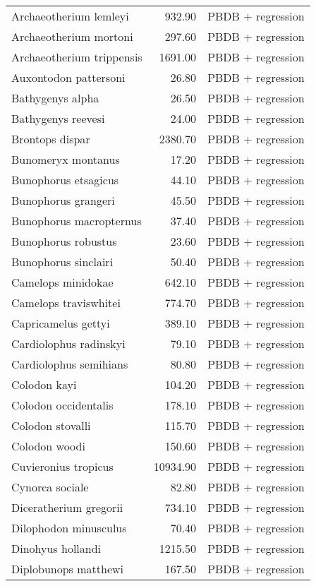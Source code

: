 \begin{table}[ht]
\begin{tabular}{lrl}
  Archaeotherium lemleyi & 932.90 & PBDB + regression \\ 
  Archaeotherium mortoni & 297.60 & PBDB + regression \\ 
  Archaeotherium trippensis & 1691.00 & PBDB + regression \\ 
  Auxontodon pattersoni & 26.80 & PBDB + regression \\ 
  Bathygenys alpha & 26.50 & PBDB + regression \\ 
  Bathygenys reevesi & 24.00 & PBDB + regression \\ 
  Brontops dispar & 2380.70 & PBDB + regression \\ 
  Bunomeryx montanus & 17.20 & PBDB + regression \\ 
  Bunophorus etsagicus & 44.10 & PBDB + regression \\ 
  Bunophorus grangeri & 45.50 & PBDB + regression \\ 
  Bunophorus macropternus & 37.40 & PBDB + regression \\ 
  Bunophorus robustus & 23.60 & PBDB + regression \\ 
  Bunophorus sinclairi & 50.40 & PBDB + regression \\ 
  Camelops minidokae & 642.10 & PBDB + regression \\ 
  Camelops traviswhitei & 774.70 & PBDB + regression \\ 
  Capricamelus gettyi & 389.10 & PBDB + regression \\ 
  Cardiolophus radinskyi & 79.10 & PBDB + regression \\ 
  Cardiolophus semihians & 80.80 & PBDB + regression \\ 
  Colodon kayi & 104.20 & PBDB + regression \\ 
  Colodon occidentalis & 178.10 & PBDB + regression \\ 
  Colodon stovalli & 115.70 & PBDB + regression \\ 
  Colodon woodi & 150.60 & PBDB + regression \\ 
  Cuvieronius tropicus & 10934.90 & PBDB + regression \\ 
  Cynorca sociale & 82.80 & PBDB + regression \\ 
  Diceratherium gregorii & 734.10 & PBDB + regression \\ 
  Dilophodon minusculus & 70.40 & PBDB + regression \\ 
  Dinohyus hollandi & 1215.50 & PBDB + regression \\ 
  Diplobunops matthewi & 167.50 & PBDB + regression \\ 

\end{tabular}
\end{table}
